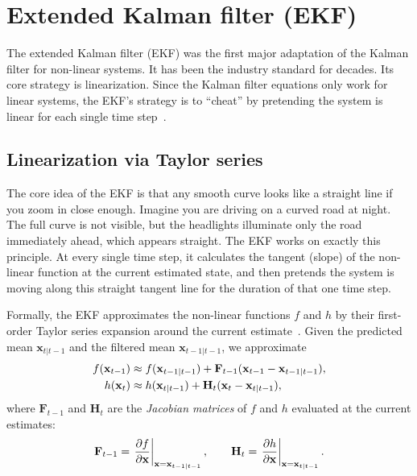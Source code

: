 
\section{Extended Kalman filter (EKF)}
The extended Kalman filter (EKF) was the first major adaptation of the Kalman filter for non-linear systems. It has been the industry standard for decades. Its core strategy is linearization. Since the Kalman filter equations only work for linear systems, the EKF's strategy is to ``cheat'' by pretending the system is linear for each single time step~\cite[Ch.~11]{labbe:kalman_and_bayesian_filters}.

\subsection{Linearization via Taylor series}
The core idea of the EKF is that any smooth curve looks like a straight line if you zoom in close enough. Imagine you are driving on a curved road at night. The full curve is not visible, but the headlights illuminate only the road immediately ahead, which appears straight. The EKF works on exactly this principle. At every single time step, it calculates the tangent (slope) of the non-linear function at the current estimated state, and then pretends the system is moving along this straight tangent line for the duration of that one time step.

Formally, the EKF approximates the non-linear functions $f$ and $h$ by their first-order Taylor series expansion around the current estimate~\cite[Ch.~5]{sarkka:bayesian_filtering}. Given the predicted mean $\mathbf{x}_{t|t-1}$ and the filtered mean $\mathbf{x}_{t-1|t-1}$, we approximate
\begin{align}
  f(\mathbf{x}_{t-1}) &\approx f(\mathbf{x}_{t-1|t-1})
    + \mathbf{F}_{t-1}(\mathbf{x}_{t-1} - \mathbf{x}_{t-1|t-1}),
  \label{eq:ekf f linearise} \\
  h(\mathbf{x}_{t})   &\approx h(\mathbf{x}_{t|t-1})
    + \mathbf{H}_{t}(\mathbf{x}_{t} - \mathbf{x}_{t|t-1}),
  \label{eq:ekf-h-linearise}
\end{align}
where $\mathbf{F}_{t-1}$ and $\mathbf{H}_{t}$ are the \emph{Jacobian matrices} of $f$ and $h$ evaluated at the current estimates:
\begin{equation}\label{eq:ekf jacobians}
    \mathbf{F}_{t-1} = \left.\frac{\partial f}{\partial \mathbf{x}}\right|_{\mathbf{x} = \mathbf{x}_{t-1|t-1}}, \qquad
    \mathbf{H}_{t} = \left.\frac{\partial h}{\partial \mathbf{x}}\right|_{\mathbf{x} = \mathbf{x}_{t|t-1}} .
\end{equation}


